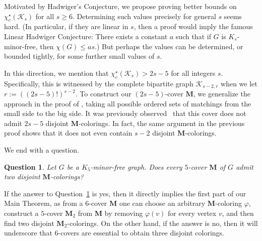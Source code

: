 \documentclass[11pt]{article}
\newtheorem{ques}[thm]{Question}
\theoremstyle{definition}
\newcommand\vph{\varphi}
\newcommand\chisc{\chi^{\star}_{c}}
\renewcommand\ge{\geqslant}
\renewcommand\le{\leqslant}
\newcommand\K{\mathcal{K}}
\newcommand\MM{\textbf{M}}
\begin{document}
Motivated by Hadwiger's Conjecture, we propose proving better bounds on $\chisc(\K_s)$ for all $s\ge 6$.
Determining such values precisely for general $s$ seems hard.  (In particular, if they are linear in $s$,
then a proof would imply the famous Linear Hadwiger Conjecture: There exists a constant $a$ such that if
$G$ is $K_s$-minor-free, then $\chi(G)\le as$.) But perhaps the values can be determined, or bounded tightly,
for some further small values of $s$.

In this direction, we mention that $\chisc(\K_s)>2s-5$ for all integers $s$.  Specifically, this is 
witnessed by the complete bipartite graph $\K_{s-2,r}$ when we let $r:=((2s-5)!)^{s-2}$.  To construct our 
$(2s-5)$-cover $\MM$, we generalize the approach in the proof of , taking all possible 
ordered sets of matchings from the small side to the big side.  It was previously 
observed~\cite[Proposition~24]{CCvBDK} that this cover does not admit $2s-5$ disjoint $\MM$-colorings. 
In fact, the same argument in the previous proof shows that
it does not even contain $s-2$ disjoint $\MM$-colorings.
\bigskip

We end with a question.
\begin{ques}\label{question_twodisjoint}
Let $G$ be a $K_5$-minor-free graph. Does every $5$-cover $\MM$ of $G$
admit two disjoint $\MM$-colorings?
\end{ques}
If the answer to Question~\ref{question_twodisjoint} is yes, then it directly implies the first part of our Main Theorem, as from a $6$-cover $\MM$ one can choose an arbitrary $\MM$-coloring $\vph$, construct a $5$-cover $\MM_2$ from $\MM$ by removing $\vph(v)$ for every vertex $v$, and then find two disjoint $\MM_2$-colorings. On the other hand, if the answer is no, then it will underscore that $6$-covers are essential to obtain three disjoint colorings.

\footnotesize{


}
\end{document}
